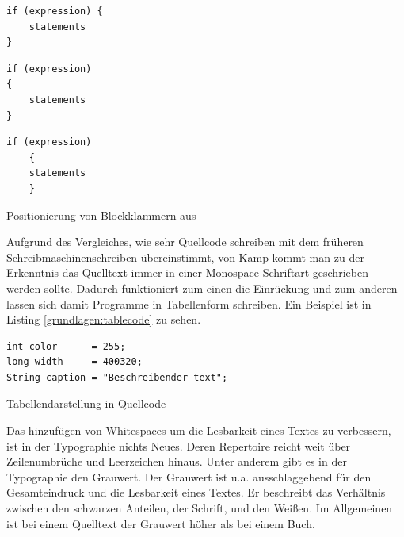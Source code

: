 \begin{listing}[H]
        \begin{minipage}{0.35\textwidth}
            \centering
	    \begin{verbatim}
if (expression) {
    statements
}
	    \end{verbatim}
        \end{minipage}
        \begin{minipage}{0.3\textwidth}
            \centering
	    \begin{verbatim}
if (expression)
{
    statements
}
	    \end{verbatim}
        \end{minipage}
        \begin{minipage}{0.3\textwidth}
            \centering
	    \begin{verbatim}
if (expression)
	{
    statements
	}
	    \end{verbatim}
        \end{minipage}
    \caption{Positionierung von Blockklammern aus \cite[S. 8]{Green}}
    \label{grundlagen:blockklammern}
\end{listing}

Aufgrund des Vergleiches, wie sehr Quellcode schreiben mit dem früheren Schreibmaschinenschreiben übereinstimmt, von Kamp\cite{Kamp} kommt man zu der Erkenntnis das Quelltext immer in einer Monospace Schriftart geschrieben werden sollte\cite[S. 2]{Green}. Dadurch funktioniert zum einen die Einrückung und zum anderen lassen sich damit Programme in Tabellenform schreiben. Ein Beispiel ist in Listing \ref{grundlagen:tablecode} zu sehen.

\begin{listing}[H]
    \begin{verbatim}
int color      = 255;
long width     = 400320;
String caption = "Beschreibender text";
    \end{verbatim}
    \caption{Tabellendarstellung in Quellcode}
    \label{grundlagen:tablecode}
\end{listing}

Das hinzufügen von Whitespaces um die Lesbarkeit eines Textes zu verbessern, ist in der Typographie nichts Neues. Deren Repertoire reicht weit über Zeilenumbrüche und Leerzeichen hinaus. Unter anderem gibt es in der Typographie den Grauwert. Der Grauwert ist u.a. ausschlaggebend für den Gesamteindruck und die Lesbarkeit
eines Textes. Er beschreibt das Verhältnis zwischen den schwarzen Anteilen, der Schrift, und den Weißen. Im Allgemeinen ist bei einem Quelltext der Grauwert höher als bei einem Buch.  \cite{Beinert}


